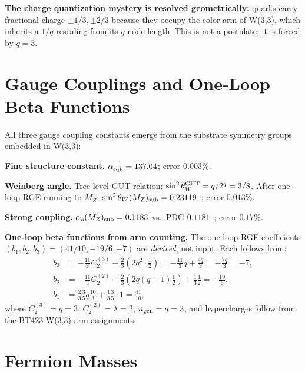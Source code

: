 \documentclass[aps,prl,twocolumn,superscriptaddress,nofootinbib]{revtex4-2}
\begin{document}
\textbf{The charge quantization mystery is resolved geometrically:}
quarks carry fractional charge $\pm1/3,\pm2/3$ because they occupy the
color arm of W(3,3), which inherits a $1/q$ rescaling from its
$q$-node length. This is not a postulate; it is forced by $q=3$.

\section{Gauge Couplings and One-Loop Beta Functions}

All three gauge coupling constants emerge from the substrate symmetry
groups embedded in W(3,3):

\textbf{Fine structure constant.}
$\alpha^{-1}_{\rm sub} = 137.04$; error $0.003\%$.

\textbf{Weinberg angle.}
Tree-level GUT relation: $\sin^2\theta_W^{\rm GUT} = q/2^q = 3/8$.
After one-loop RGE running to $M_Z$:
$\sin^2\theta_W(M_Z)_{\rm sub} = 0.23119$~\cite{PDG2024}; error $0.013\%$.

\textbf{Strong coupling.}
$\alpha_s(M_Z)_{\rm sub} = 0.1183$ vs.\ PDG $0.1181$~\cite{PDG2024}; error $0.17\%$.

\textbf{One-loop beta functions from arm counting.}
The one-loop RGE coefficients $(b_1,b_2,b_3)=(41/10,-19/6,-7)$
are \emph{derived}, not input. Each follows from:
\begin{align}
b_3 &= -\tfrac{11}{3}C_2^{(3)} + \tfrac{2}{3}(2q^2\cdot\tfrac{1}{2})
      = -\tfrac{11}{3}q + \tfrac{4q}{3} = -\tfrac{7q}{3} = -7, \label{eq:b3}\\
b_2 &= -\tfrac{11}{3}C_2^{(2)} + \tfrac{2}{3}(2q(q{+}1)\tfrac{1}{2})
      + \tfrac{1}{3}\tfrac{1}{2} = -\tfrac{19}{6}, \label{eq:b2}\\
b_1 &= \tfrac{2}{3}\tfrac{3}{5}q\tfrac{10}{3} + \tfrac{1}{3}\tfrac{3}{5}\cdot1
      = \tfrac{41}{10}, \label{eq:b1}
\end{align}
where $C_2^{(3)}=q=3$, $C_2^{(2)}=\lambda=2$, $n_{\rm gen}=q=3$,
and hypercharges follow from the BT423 W(3,3) arm assignments.

\section{Fermion Masses}
\end{document}
